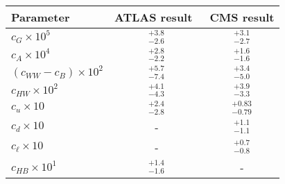 \begin{tabular}{lcc}
  Parameter & ATLAS result~\cite{ATL-PHYS-PUB-2017-018} & CMS result \\ \hline
  $c_G \times 10^5$ & {}$^{+3.8}_{-2.6}$  & {}$^{+3.1}_{-2.7}$ \\ 
  
  $c_A \times 10^4$ & {}$^{+2.8}_{-2.2}$  & {}$^{+1.6}_{-1.6}$ \\
  
  $(c_{WW}-c_B) \times 10^2$ & {}$^{+5.7}_{-7.4}$  & {}$^{+3.4}_{-5.0}$ \\
  
  $c_{HW} \times 10^2$ & {}$^{+4.1}_{-4.3}$  & {}$^{+3.9}_{-3.3}$ \\

  $c_u \times 10$ & {}$^{+2.4}_{-2.8}$  & {}$^{+0.83}_{-0.79}$ \\ \hline
  
  $c_d \times 10$ & -  & {}$^{+1.1}_{-1.1}$ \\
  
  $c_\ell \times 10$ & -  & {}$^{+0.7}_{-0.8}$ \\ \hline
  
  $c_{HB} \times 10^1$ & {}$^{+1.4}_{-1.6}$  & - \\

\end{tabular}